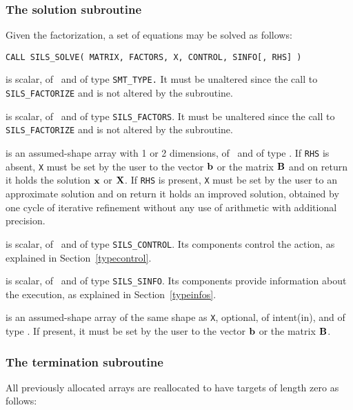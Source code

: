 \documentclass{galahad}
\newcommand{\packagename}{SILS}
\begin{document}

\subsubsection{The solution subroutine}
Given the factorization, a set of equations may be solved as follows:

\hskip0.5in
{\tt CALL \packagename\_SOLVE( MATRIX, FACTORS, X, CONTROL, SINFO[, RHS] )}

\begin{description}

 is scalar, of \intentin\ and of type {\tt SMT\_TYPE.}  It
must be unaltered since the call to {\tt \packagename\_FACTORIZE} and is
not altered by the subroutine.

 is scalar, of \intentin\ and of type {\tt \packagename\_FACTORS}.
It must be unaltered since the call to {\tt \packagename\_FACTORIZE} and is
not altered by the subroutine.

 is an assumed-shape array with 1 or 2 dimensions, of
\intentinout\, and of type \realdp.  If {\tt RHS} is absent, {\tt X} must
be set
by the user to the vector ${\mathbf{b}}$ or the matrix ${\mathbf{B}}$ and on return it holds
the solution ${\mathbf{x}}$ or ${\mathbf{X}}$.
If {\tt RHS} is present, {\tt X} must be set by the user
to an approximate solution and on return it holds an improved solution,
obtained by one cycle of iterative refinement without any use of
arithmetic with additional precision.

 is scalar, of \intentin\ and of type {\tt \packagename\_CONTROL}.
Its components control the action, as explained in Section~\ref{typecontrol}.

 is scalar, of \intentout\, and of type {\tt \packagename\_SINFO}.
Its components provide information about the execution, as explained in
Section~\ref{typeinfos}.

 is an assumed-shape array of the same shape as {\tt X}, optional, of
intent(in), and of type \realdp. If present, it must be set by the user
to the vector ${\mathbf{b}}$ or the matrix ${\mathbf{B}}$.

\end{description}


\subsubsection{The termination subroutine}
All previously allocated arrays are reallocated to have targets of length zero
as follows:
\end{document}
